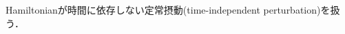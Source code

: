 \documentclass{report}
\begin{document}
  Hamiltonianが時間に依存しない定常摂動(time-independent perturbation)を扱う．
\end{document}
